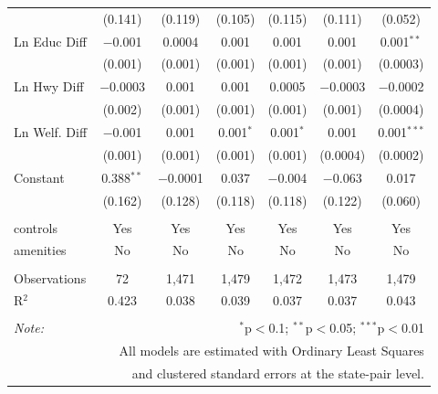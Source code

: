 \begin{table}[!htbp]
\begin{tabular}{@{\extracolsep{5pt}}lcccccc}
  & (0.141) & (0.119) & (0.105) & (0.115) & (0.111) & (0.052) \\ 
  Ln Educ Diff & $-$0.001 & 0.0004 & 0.001 & 0.001 & 0.001 & 0.001$^{**}$ \\ 
  & (0.001) & (0.001) & (0.001) & (0.001) & (0.001) & (0.0003) \\ 
  Ln Hwy Diff & $-$0.0003 & 0.001 & 0.001 & 0.0005 & $-$0.0003 & $-$0.0002 \\ 
  & (0.002) & (0.001) & (0.001) & (0.001) & (0.001) & (0.0004) \\ 
  Ln Welf. Diff & $-$0.001 & 0.001 & 0.001$^{*}$ & 0.001$^{*}$ & 0.001 & 0.001$^{***}$ \\ 
  & (0.001) & (0.001) & (0.001) & (0.001) & (0.0004) & (0.0002) \\ 
  Constant & 0.388$^{**}$ & $-$0.0001 & 0.037 & $-$0.004 & $-$0.063 & 0.017 \\ 
  & (0.162) & (0.128) & (0.118) & (0.118) & (0.122) & (0.060) \\ 
 \hline \\[-1.8ex] 
controls & Yes & Yes & Yes & Yes & Yes & Yes \\ 
amenities & No & No & No & No & No & No \\ 
\hline \\[-1.8ex] 
Observations & 72 & 1,471 & 1,479 & 1,472 & 1,473 & 1,479 \\ 
R$^{2}$ & 0.423 & 0.038 & 0.039 & 0.037 & 0.037 & 0.043 \\ 
\hline 
\hline \\[-1.8ex] 
\textit{Note:}  & \multicolumn{6}{r}{$^{*}$p$<$0.1; $^{**}$p$<$0.05; $^{***}$p$<$0.01} \\ 
 & \multicolumn{6}{r}{All models are estimated with Ordinary Least Squares} \\ 
 & \multicolumn{6}{r}{and clustered standard errors at the state-pair level.} \\ 
\end{tabular} 
\end{table} 
